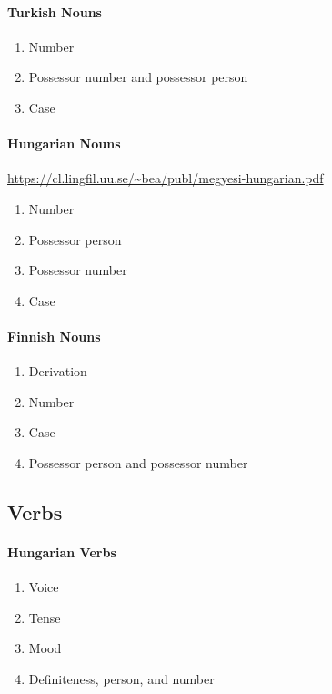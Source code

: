\documentclass[11pt,letterpaper]{article}
\begin{document}
\paragraph{Turkish Nouns}
\begin{enumerate}
    \item Number
    \item Possessor number and possessor person
    \item Case 
\end{enumerate}

\paragraph{Hungarian Nouns}
\url{https://cl.lingfil.uu.se/~bea/publ/megyesi-hungarian.pdf}
\begin{enumerate}
    \item Number
    \item Possessor person
    \item Possessor number
    \item Case 
\end{enumerate}

\paragraph{Finnish Nouns}
\begin{enumerate}
    \item Derivation
    \item Number
    \item Case 
    \item Possessor person and possessor number
\end{enumerate}

\subsection{Verbs}

\paragraph{Hungarian Verbs}
\begin{enumerate}
    \item Voice
    \item Tense 
    \item Mood
    \item Definiteness, person, and number
\end{enumerate}
\end{document}
